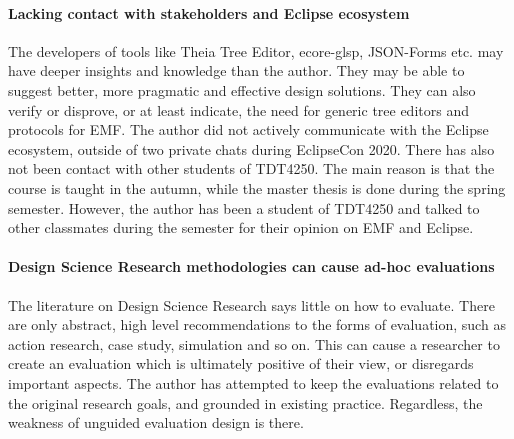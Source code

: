 \paragraph{Lacking contact with stakeholders and Eclipse ecosystem}
The developers of tools like Theia Tree Editor, ecore-glsp, JSON-Forms etc. may have deeper insights and knowledge than the author.
They may be able to suggest better, more pragmatic and effective design solutions.
They can also verify or disprove, or at least indicate, the need for generic tree editors and protocols for \acrshort{EMF}.
The author did not actively communicate with the Eclipse ecosystem, outside of two private chats during EclipseCon 2020.
There has also not been contact with other students of \gls{TDT4250}.
The main reason is that the course is taught in the autumn, while the master thesis is done during the spring semester.
However, the author has been a student of \gls{TDT4250} and talked to other classmates during the semester for their opinion on \acrshort{EMF} and \gls{Eclipse}.

\paragraph{Design Science Research methodologies can cause ad-hoc evaluations}
The literature on Design Science Research says little on how to evaluate.
There are only abstract, high level recommendations to the forms of evaluation, such as action research, case study, simulation and so on.
This can cause a researcher to create an evaluation which is ultimately positive of their view, or disregards important aspects.
The author has attempted to keep the evaluations related to the original research goals, and grounded in existing practice.
Regardless, the weakness of unguided evaluation design is there.

